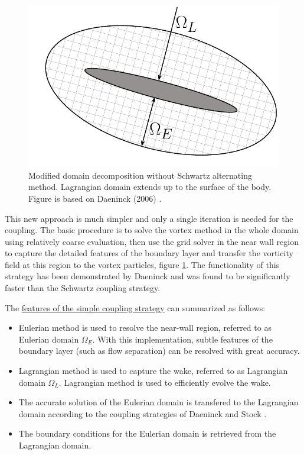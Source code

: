 	\begin{figure}[!b]
		\centering
		\includegraphics[width=0.5\linewidth]{figures/introduction/domainDecomposition_daenick.pdf}
		\caption{Modified domain decomposition without Schwartz alternating method. Lagrangian domain extends up to the surface of the body. Figure is based on Daeninck (2006) \cite{Daeninck2006}.}
		\label{fig:domainDecomposition_daenick}
	\end{figure}

This new approach is much simpler and only a single iteration is needed for the coupling. The basic procedure is to solve the vortex method in the whole domain using relatively coarse evaluation, then use the grid solver in the near wall region to capture the detailed features of the boundary layer and transfer the vorticity field at this region to the vortex particles, figure \ref{fig:domainDecomposition_daenick}. The functionality of this strategy has been demonstrated by Daeninck and was found to be significantly faster than the Schwartz coupling strategy.

The \underline{features of the simple coupling strategy} can summarized as follows:

	\begin{itemize}
	\item Eulerian method is used to resolve the near-wall region, referred to as Eulerian domain $\Omega_E$. With this implementation, subtle features of the boundary layer (such as flow separation) can be resolved with great accuracy.
	\item Lagrangian method is used to capture the wake, referred to as Lagrangian domain $\Omega_L$. Lagrangian method is used to efficiently evolve the wake.
	\item The accurate solution of the Eulerian domain is transfered to the Lagrangian domain according to the coupling strategies of Daeninck \cite{Daeninck2006} and Stock \cite{Stock}.
	\item The boundary conditions for the Eulerian domain is retrieved from the Lagrangian domain.
	\end{itemize}


